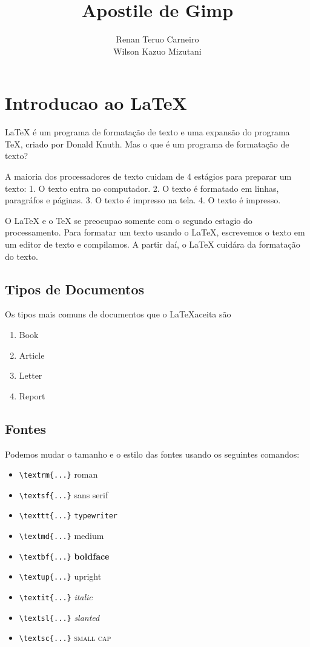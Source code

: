 \documentclass[12pt,onecolumn]{article}
\begin{document}
\title{Apostile de Gimp}
\author{Renan Teruo Carneiro \\ Wilson Kazuo Mizutani}
\maketitle

\section{Introducao ao \LaTeX}
    LaTeX é um programa de formatação de texto e uma expansão do programa
    TeX, criado por Donald Knuth. Mas o que é um programa de
    formatação de texto?

    A maioria dos processadores de texto cuidam de 4 estágios para preparar
    um texto:
    1. O texto entra no computador.
    2. O texto é formatado em linhas, paragráfos e páginas.
    3. O texto é impresso na tela.
    4. O texto é impresso.

    O LaTeX e o TeX se preocupao somente com o segundo estagio
    do processamento. Para formatar um texto usando o LaTeX, escrevemos
    o texto em um editor de texto e compilamos. A partir daí, o \LaTeX
    cuidára da formatação do texto.

\subsection{Tipos de Documentos}
    Os tipos mais comuns de documentos que o \LaTeX aceita são
    \begin{enumerate}
    \item Book
    \item Article
    \item Letter
    \item Report
    \end{enumerate}

\subsection{Fontes}

    Podemos mudar o tamanho e o estilo das fontes usando os seguintes
    comandos:
    \begin{itemize}
    \item \verb#\textrm{...}# \textrm{roman}
    \item \verb#\textsf{...}# \textsf{sans serif}
    \item \verb#\texttt{...}# \texttt{typewriter}
    \item \verb#\textmd{...}# \textmd{medium}
    \item \verb#\textbf{...}# \textbf{boldface}
    \item \verb#\textup{...}# \textup{upright}
    \item \verb#\textit{...}# \textit{italic}
    \item \verb#\textsl{...}# \textsl{slanted}
    \item \verb#\textsc{...}# \textsc{small cap}
    \end{itemize}
\end{document}
